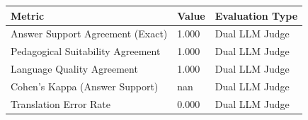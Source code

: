 \begin{tabular}{lll}
\toprule
Metric & Value & Evaluation Type \\
\midrule
Answer Support Agreement (Exact) & 1.000 & Dual LLM Judge \\
Pedagogical Suitability Agreement & 1.000 & Dual LLM Judge \\
Language Quality Agreement & 1.000 & Dual LLM Judge \\
Cohen's Kappa (Answer Support) & nan & Dual LLM Judge \\
Translation Error Rate & 0.000 & Dual LLM Judge \\
\bottomrule
\end{tabular}
